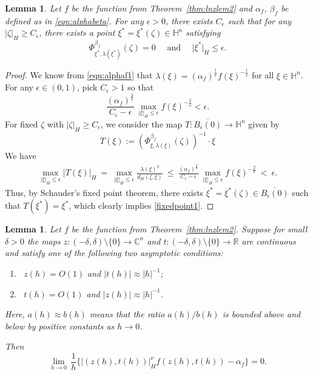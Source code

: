 \documentclass[reqno]{amsart}
\newtheorem{lem}[thm]{Lemma}
\theoremstyle{definition}
\theoremstyle{remark}
\numberwithin{equation}{section}
\begin{document}
\begin{lem}\label{lem:fixedpoint1}
Let $f$ be the function from Theorem~\ref{thm:lnzlem2} and $\alpha_f$, $\beta_f$ be defined as in \eqref{eqn:alphabeta}.
For any $\epsilon>0$, there exists $C_{\epsilon}$ such that for any $|\zeta|_{\! H} \geq C_{\epsilon}$, there exists a point $\xi^{\ast}=\xi^{\ast}(\zeta) \in \mathbb{H}^n$ satisfying
\begin{equation}\label{fixedpoint1}
\Phi_{\xi^{\ast}, \lambda(\xi^{\ast})}^{\beta_f}(\zeta) = 0 
\quad \text { and } \quad \big|\xi^{\ast}\big|_{\! H} \leq \epsilon. 
\end{equation}
\end{lem}

\begin{proof}
We know from \eqref{eqn:alphaf1} that $\lambda(\xi)= \left(\alpha_f\right)^{\frac {1}{\nu}} f(\xi)^{-\frac {1}{\nu}}$ for all $\xi \in \mathbb{H}^{n}$. For any $\epsilon \in(0,1)$, pick $C_{\epsilon}>1$ so that
\[
\frac {\left(\alpha_f\right)^{\frac {2}{\nu}}} {C_{\epsilon}-\epsilon}\, \max_{|\xi|_{\! H} \leq \epsilon} f(\xi)^{-\frac {2}{\nu}} < \epsilon.
\]
For fixed $\zeta$ with $|\zeta|_{\! H} \geq C_{\epsilon}$, we consider the map $T:\overline{B_{\epsilon}(0)} \to 
\mathbb{H}^n$ given by
\[
T(\xi):= \left( \Phi_{\xi,\lambda(\xi)}^{\beta_f} (\zeta)\right)^{-1} \cdot \xi
\]
We have
\begin{align*}
\max_{|\xi|_{\! H} \leq \epsilon} \left|T(\xi)\right|_{\! H} 
~=~ \max_{|\xi|_{\! H} \leq \epsilon} \frac {\lambda(\xi)^2} {d_{\! H}\! \left(\zeta,\xi\right)} 
~\leq~ \frac {\left(\alpha_f\right)^{\frac {2}{\nu}}} {C_{\epsilon}-\epsilon}\, \max_{|\xi|_{\! H} \leq \epsilon} f(\xi)^{-\frac {2}{\nu}}
~<~ \epsilon.
\end{align*}
Thus, by Schauder's fixed point theorem, there exists $\xi^{\ast}=\xi^{\ast}(\zeta)\in \overline{B_{\epsilon}(0)}$ such that 
$T(\xi^{\ast})=\xi^{\ast}$, which clearly implies \eqref{fixedpoint1}.
\end{proof}




\begin{lem}\label{lem:asymp}
Let $f$ be the function from Theorem~\ref{thm:lnzlem2}. Suppose for small $\delta>0$ the maps $z \colon (-\delta, \delta) \setminus \{0\} \to \mathbb{C}^n$ and $t \colon (-\delta, \delta) \setminus \{0\} \to \mathbb{R}$ are continuous and satisfy one of the following two asymptotic conditions:
\begin{enumerate}
\item[(A1)]\, $z(h) = O(1)$ and $|t(h)| \approx |h|^{-1}$;
\item[(A2)]\, $t(h) = O(1)$ and $|z(h)| \approx |h|^{-1}$.
\end{enumerate}
Here, $a(h) \approx b(h)$ means that the ratio $a(h)/b(h)$ is bounded above and below by positive constants as $h \to 0$.

Then 
\begin{equation}\label{eqn:asym2}
\lim_{h \to 0} \, \frac{1}{h} \Big\{ \bigl|(z(h), t(h))\bigr|_{\! H}^{\nu}  f(z(h), t(h)) - \alpha_f \Big\} = 0.
\end{equation}
\end{lem}
\end{document}
